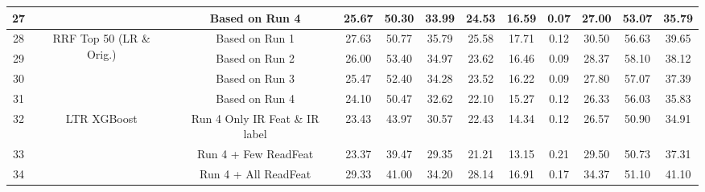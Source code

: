\begin{table*}
{\begin{tabular}{c|c|c|ccc|cc|c|ccc}
27 &  & Based on Run 4 & 25.67 & 50.30 & 33.99 & 24.53 & 16.59 & 0.07 & 27.00 & 53.07 & 35.79\tabularnewline
\midrule 
28 & \multirow{4}{*}{RRF Top 50 (LR \& Orig.)} & Based on Run 1 & 27.63 & 50.77 & 35.79 & 25.58 & 17.71 & 0.12 & 30.50 & 56.63 & 39.65\tabularnewline
29 &  & Based on Run 2 & 26.00 & 53.40 & 34.97 & 23.62 & 16.46 & 0.09 & 28.37 & 58.10 & 38.12\tabularnewline
30 &  & Based on Run 3 & 25.47 & 52.40 & 34.28 & 23.52 & 16.22 & 0.09 & 27.80 & 57.07 & 37.39\tabularnewline
31 &  & Based on Run 4 & 24.10 & 50.47 & 32.62 & 22.10 & 15.27 & 0.12 & 26.33 & 56.03 & 35.83\tabularnewline
\midrule 
\midrule 
32 & \multirow{3}{*}{LTR XGBoost} & Run 4 Only IR Feat \& IR label & 23.43 & 43.97 & 30.57 & 22.43 & 14.34 & 0.12 & 26.57 & 50.90 & 34.91\tabularnewline
33 &                          & Run 4 + Few ReadFeat & 23.37 & 39.47 & 29.35 & 21.21 & 13.15 & 0.21 & 29.50 & 50.73 & 37.31\tabularnewline
34 &                          & Run 4 + All ReadFeat & 29.33 & 41.00 & 34.20 & 28.14 & 16.91 & 0.17 & 34.37 & 51.10 & 41.10\tabularnewline
\bottomrule 
\end{tabular}
%
} %
\end{table*}
